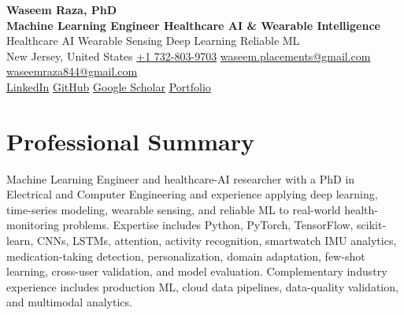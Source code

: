 \documentclass[9pt,letterpaper]{extarticle}
\begin{document}
\begin{center}
{\LARGE\bfseries Waseem Raza, PhD}\\[2pt]
{\large\bfseries Machine Learning Engineer \textbar{} Healthcare AI \& Wearable Intelligence}\\[1pt]
{\small Healthcare AI \textbar{} Wearable Sensing \textbar{} Deep Learning \textbar{} Reliable ML}\\[3pt]
{\footnotesize New Jersey, United States \quad {}\enspace \href{tel:+17328039703}{+1 732-803-9703} \quad {}\enspace \href{mailto:waseem.placements@gmail.com}{waseem.placements@gmail.com} \textbar{} \href{mailto:waseemraza844@gmail.com}{waseemraza844@gmail.com}\\[1pt]\href{https://www.linkedin.com/in/waseem-raza-phd-9a737858/}{LinkedIn} \textbar{} \href{https://github.com/WaseemRaza844}{GitHub} \textbar{} \href{https://scholar.google.com/citations?user=d58Drr0AAAAJ\&hl=en}{Google Scholar} \textbar{} \href{https://waseemraza844.github.io/portfolio/}{Portfolio}}
\end{center}
\vspace{-5pt}
\section{Professional Summary}
Machine Learning Engineer and healthcare-AI researcher with a PhD in Electrical and Computer Engineering and experience applying deep learning, time-series modeling, wearable sensing, and reliable ML to real-world health-monitoring problems. Expertise includes Python, PyTorch, TensorFlow, scikit-learn, CNNs, LSTMs, attention, activity recognition, smartwatch IMU analytics, medication-taking detection, personalization, domain adaptation, few-shot learning, cross-user validation, and model evaluation. Complementary industry experience includes production ML, cloud data pipelines, data-quality validation, and multimodal analytics.
\end{document}
